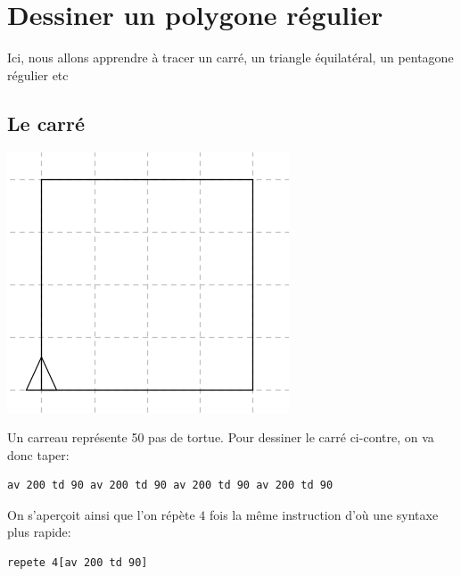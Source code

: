 \section{Dessiner un polygone régulier}
\noindent Ici, nous allons apprendre à tracer un carré, un triangle équilatéral, un pentagone régulier etc
\subsection{Le carré}
\begin{center}
\includegraphics{images/bases-carre.png}
\end{center}
\noindent Un carreau représente 50 pas de tortue. Pour dessiner le carré ci-contre, on va donc taper:
\begin{verbatim}
av 200 td 90 av 200 td 90 av 200 td 90 av 200 td 90
\end{verbatim}
On s'aperçoit ainsi que l'on répète $4$ fois la même instruction d'où une syntaxe plus rapide:
\begin{verbatim}
repete 4[av 200 td 90]
\end{verbatim}

